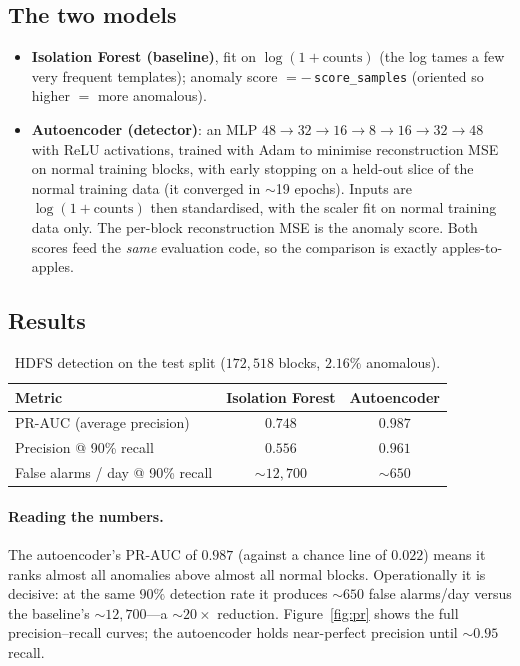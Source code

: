 \documentclass[11pt,a4paper]{article}
\newcommand{\ours}[1]{{\color{good}\textbf{#1}}}
\newcommand{\code}[1]{\texttt{\small #1}}
\begin{document}
\subsection{The two models}
\begin{itemize}[nosep,leftmargin=1.5em]
  \item \textbf{Isolation Forest (baseline)}, fit on $\log(1+\text{counts})$ (the
  log tames a few very frequent templates); anomaly score $=-\,$\code{score\_samples}
  (oriented so higher $=$ more anomalous).
  \item \textbf{Autoencoder (detector)}: an MLP
  $48\!\to\!32\!\to\!16\!\to\!8\!\to\!16\!\to\!32\!\to\!48$ with ReLU
  activations, trained with Adam to minimise reconstruction MSE on normal
  training blocks, with early stopping on a held-out slice of the normal training
  data (it converged in $\sim$19 epochs). Inputs are $\log(1+\text{counts})$ then
  standardised, with the scaler fit on normal training data only. The per-block
  reconstruction MSE is the anomaly score. Both scores feed the \emph{same}
  evaluation code, so the comparison is exactly apples-to-apples.
\end{itemize}

\subsection{Results}
\begin{table}[H]
\centering
\caption{HDFS detection on the test split ($172{,}518$ blocks, $2.16\%$
anomalous).}
\label{tab:detect}
\small
\renewcommand{\arraystretch}{1.15}
\begin{tabular}{@{}l c c@{}}
\toprule
Metric & Isolation Forest & \color{good}Autoencoder \\
\midrule
PR-AUC (average precision) & $0.748$ & \ours{$0.987$} \\
Precision @ 90\% recall & $0.556$ & \ours{$0.961$} \\
False alarms / day @ 90\% recall & $\sim$$12{,}700$ & \ours{$\sim$$650$} \\
\bottomrule
\end{tabular}
\end{table}

\paragraph{Reading the numbers.} The autoencoder's PR-AUC of $0.987$ (against a
chance line of $0.022$) means it ranks almost all anomalies above almost all
normal blocks. Operationally it is decisive: at the same $90\%$ detection rate it
produces $\sim$$650$ false alarms/day versus the baseline's $\sim$$12{,}700$---a
$\sim$$20\times$ reduction. Figure~\ref{fig:pr} shows the full precision--recall
curves; the autoencoder holds near-perfect precision until $\sim$$0.95$ recall.
\end{document}
